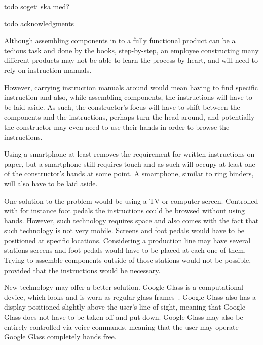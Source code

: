 %
%
%
%
%
todo sogeti ska med?

todo acknowledgments

Although assembling components in to a fully functional product can be a tedious task and done by the books, step-by-step, an employee constructing many different products may not be able to learn the process by heart, and will need to rely on instruction manuals.

However, carrying instruction manuals around would mean having to find specific instruction and also, while assembling components, the instructions will have to be laid aside. As such, the constructor's focus will have to shift between the components and the instructions, perhaps turn the head around, and potentially the constructor may even need to use their hands in order to browse the instructions. 

Using a smartphone at least removes the requirement for written instructions on paper, but a smartphone still requires touch and as such will occupy at least one of the constructor's hands at some point. A smartphone, similar to ring binders, will also have to be laid aside.

One solution to the problem would be using a TV or computer screen. Controlled with for instance foot pedals the instructions could be browsed without using hands. However, such technology requires space and also comes with the fact that such technology is not very mobile. Screens and foot pedals would have to be positioned at specific locations. Considering a production line may have several stations screens and foot pedals would have to be placed at each one of them. Trying to assemble components outside of those stations would not be possible, provided that the instructions would be necessary.

New technology may offer a better solution. Google Glass is a computational device, which looks and is worn as regular glass frames~\cite{glassStart}. Google Glass also has a display positioned slightly above the user's line of sight, meaning that Google Glass does not have to be taken off and put down. Google Glass may also be entirely controlled via voice commands, meaning that the user may operate Google Glass completely hands free.

